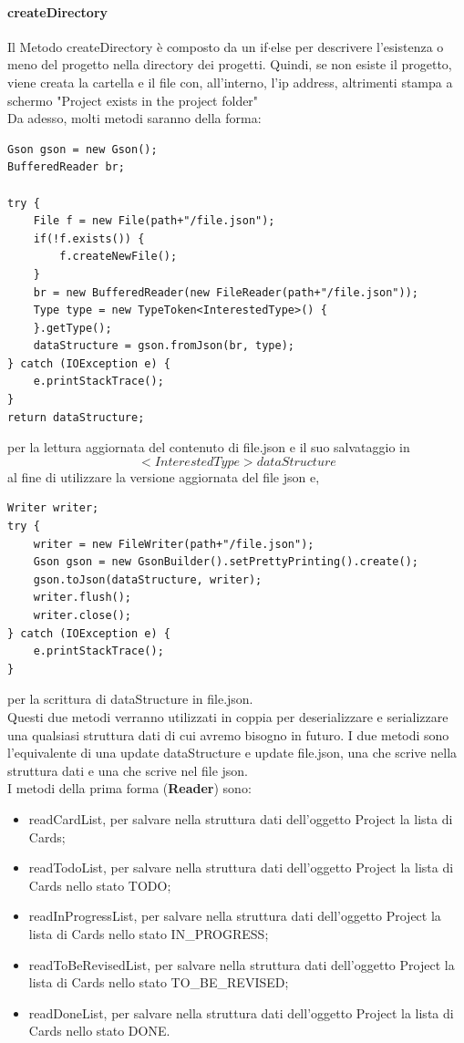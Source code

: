 \documentclass[]{article}
\begin{document}
\paragraph{createDirectory}
Il Metodo createDirectory è composto da un if$\cdot$else per descrivere l'esistenza o meno del progetto nella directory dei progetti. Quindi, se non esiste il progetto, viene creata la cartella e il file con, all'interno, l'ip address, altrimenti stampa a schermo "Project exists in the project folder"\\
Da adesso, molti metodi saranno della forma:
\begin{lstlisting}
Gson gson = new Gson();
BufferedReader br;

try {
	File f = new File(path+"/file.json");
	if(!f.exists()) {
		f.createNewFile();
	}
	br = new BufferedReader(new FileReader(path+"/file.json"));
	Type type = new TypeToken<InterestedType>() {
	}.getType();
	dataStructure = gson.fromJson(br, type);
} catch (IOException e) {
	e.printStackTrace();
}
return dataStructure;
\end{lstlisting}
per la lettura aggiornata del contenuto di file.json e il suo salvataggio in 
$$<InterestedType> dataStructure$$
al fine di utilizzare la versione aggiornata del file json e,
\begin{lstlisting}
Writer writer;
try {
	writer = new FileWriter(path+"/file.json");
	Gson gson = new GsonBuilder().setPrettyPrinting().create();
	gson.toJson(dataStructure, writer);
	writer.flush();
	writer.close();
} catch (IOException e) {
	e.printStackTrace();
}
\end{lstlisting}
per la scrittura di dataStructure in file.json.\\
Questi due metodi verranno utilizzati in coppia per deserializzare e serializzare una qualsiasi struttura dati di cui avremo bisogno in futuro.
I due metodi sono l'equivalente di una update dataStructure e update file.json, una che scrive nella struttura dati e una che scrive nel file json.\\
I metodi della prima forma (\textbf{Reader}) sono:
\begin{itemize}
	\item readCardList, per salvare nella struttura dati dell'oggetto Project la lista di Cards;
	\item readTodoList, per salvare nella struttura dati dell'oggetto Project la lista di Cards nello stato TODO;
	\item readInProgressList, per salvare nella struttura dati dell'oggetto Project la lista di Cards nello stato IN\_PROGRESS;
	\item readToBeRevisedList, per salvare nella struttura dati dell'oggetto Project la lista di Cards nello stato TO\_BE\_REVISED;
	\item readDoneList, per salvare nella struttura dati dell'oggetto Project la lista di Cards nello stato DONE.
\end{itemize}
\end{document}

